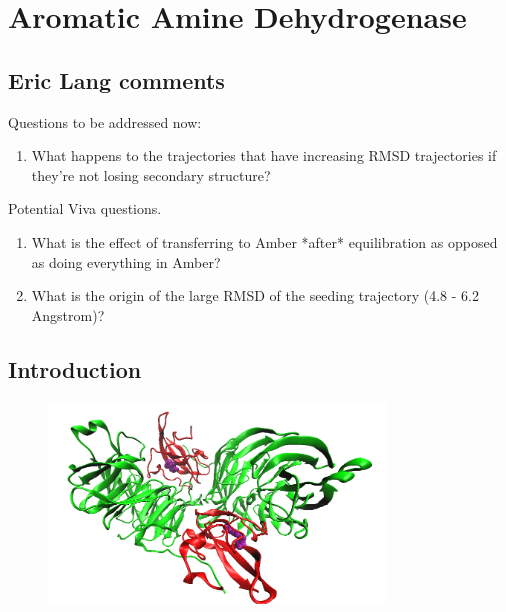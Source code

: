 %
%

\chapter{Aromatic Amine Dehydrogenase}
\label{chap:aadh}


\section{Eric Lang comments}
Questions to be addressed now: 
\begin{enumerate}
    \item What happens to the trajectories that have increasing RMSD trajectories if they're not losing secondary structure? 
\end{enumerate}


Potential Viva questions. 
\begin{enumerate}
    \item What is the effect of transferring to Amber *after* equilibration as opposed as doing everything in Amber?
    \item What is the origin of the large RMSD of the seeding trajectory (4.8 - 6.2 Angstrom)?
\end{enumerate}

\section{Introduction}
\begin{figure}
    \centering
    \includegraphics[width=0.8\textwidth]{chapters/aadh/figures/aadh_full_structure.png}
    \label{fig:aadh_full_structure}
\end{figure}

